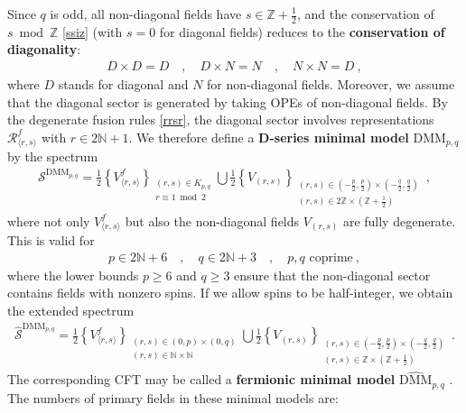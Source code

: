 \documentclass[12pt, a4paper]{article}
\newcommand{\myindex}[1]{\textbf{\boldmath #1}}
\begin{document}
Since $q$ is odd, all non-diagonal fields have $s\in \mathbb{Z}+\frac12$, and the conservation of $s\bmod \mathbb{Z}$ \eqref{ssiz} (with $s=0$ for diagonal fields) reduces to the \myindex{conservation of diagonality}:
\begin{align}
D\times D = D \quad , \quad D\times N = N \quad , \quad N\times N = D \ ,
\label{ddd}
\end{align}
where $D$ stands for diagonal and $N$ for non-diagonal fields. 
Moreover, we assume that the diagonal sector is generated by taking OPEs of non-diagonal fields. 
By the degenerate fusion rules \eqref{rrsr}, the diagonal sector involves representations $\mathcal{R}^f_{\langle r,s\rangle}$ with $r\in 2\mathbb{N}+1$. We therefore define a \myindex{D-series minimal model} $\text{DMM}_{p,q}$ by the spectrum
\begin{align}
 \boxed{\mathcal{S}^{\text{DMM}_{p,q}} = \frac12\left\{ V^f_{\langle r,s\rangle} \right\}_{\substack{(r,s)\in K_{p, q}\\ r\equiv 1\bmod 2}} 
 \bigcup 
 \frac12\left\{V_{(r,s)} \right\}_{\substack{(r,s)\in (-\frac{p}{2},\frac{p}{2})\times (-\frac{q}{2},\frac{q}{2})\\ (r,s)\in 2\mathbb{Z}\times (\mathbb{Z}+\frac12)}}
}\ ,
\label{sdmm}
\end{align}
where not only $V^f_{\langle r,s\rangle}$ but also the non-diagonal fields $V_{(r,s)}$ are fully degenerate. This is valid for
\begin{align}
 \boxed{p\in 2\mathbb{N}+6 \quad , \quad q \in 2\mathbb{N}+3 \quad ,\quad p,q\text{ coprime}} \ ,
\end{align}
where the lower bounds $p\geq 6$ and $q\geq 3$ ensure that the non-diagonal sector contains fields with nonzero spins. If we allow spins to be half-integer, we obtain the extended spectrum
\begin{align}
 \widehat{\mathcal{S}}^{\text{DMM}_{p,q}} = \frac12\left\{ V^f_{\langle r,s\rangle} \right\}_{\substack{(r,s)\in (0,p) \times (0,q)\\ (r,s)\in \mathbb{N}\times \mathbb{N}}} 
 \bigcup 
 \frac12\left\{V_{(r,s)} \right\}_{\substack{(r,s)\in (-\frac{p}{2},\frac{p}{2})\times (-\frac{q}{2},\frac{q}{2})\\ (r,s)\in \mathbb{Z}\times (\mathbb{Z}+\frac12)}}
\ .
\end{align}
The corresponding CFT may be called a \myindex{fermionic minimal model} $\widehat{\text{DMM}}_{p,q}$ \cite{rw20}. The numbers of primary fields in these minimal models are:
\end{document}
